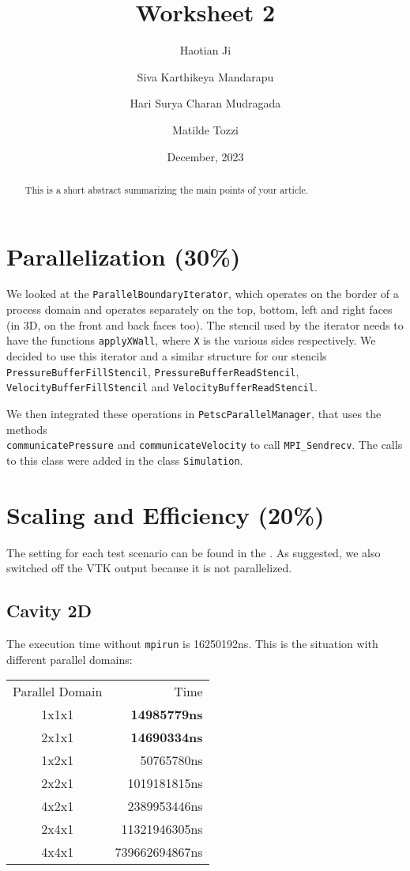 \documentclass[
  english,        %
  font=palatino,     %
  onecolumn,      %
]{tumarticle}
\title{Worksheet 2}
\author{Haotian Ji}
\author{Siva Karthikeya Mandarapu}
\author{Hari Surya Charan Mudragada}
\author{Matilde Tozzi}
\date{December, 2023}
\begin{document}
\maketitle

\begin{abstract}
  This is a short abstract summarizing the main points of your article.
\end{abstract}

\section{Parallelization (30\%)}


We looked at the \texttt{ParallelBoundaryIterator}, which operates on the border of a process domain and operates separately on the top, bottom, left and right faces (in 3D, on the front and back faces too). The stencil used by the iterator needs to have the functions \texttt{applyXWall}, where \texttt{X} is the various sides respectively. We decided to use this iterator and a similar structure for our stencils \texttt{PressureBufferFillStencil}, \texttt{PressureBufferReadStencil}, \texttt{VelocityBufferFillStencil} and \texttt{VelocityBufferReadStencil}.

We then integrated these operations in \texttt{PetscParallelManager}, that uses the methods \\\texttt{communicatePressure} and \texttt{communicateVelocity} to call \texttt{MPI\_Sendrecv}. The calls to this class were added in the class \texttt{Simulation}.

\section{Scaling and Efficiency (20\%)}

The setting for each test scenario can be found in the . As suggested, we also switched off the VTK output because it is not parallelized.

\subsection{Cavity 2D}

The execution time without \texttt{mpirun} is 16250192ns. This is the situation with different parallel domains:

\begin{tabular}{c r}
  Parallel Domain & Time                \\
  1x1x1           & \textbf{14985779ns} \\
  2x1x1           & \textbf{14690334ns} \\
  1x2x1           & 50765780ns          \\
  2x2x1           & 1019181815ns        \\
  4x2x1           & 2389953446ns        \\
  2x4x1           & 11321946305ns       \\
  4x4x1           & 739662694867ns      \\
\end{tabular}
\end{document}
